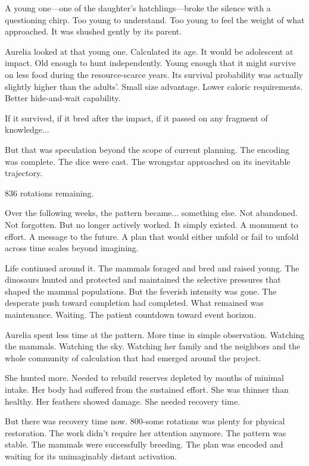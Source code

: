 A young one—one of the daughter's hatchlings—broke the silence with a questioning chirp. Too young to understand. Too young to feel the weight of what approached. It was shushed gently by its parent.

Aurelia looked at that young one. Calculated its age. It would be adolescent at impact. Old enough to hunt independently. Young enough that it might survive on less food during the resource-scarce years. Its survival probability was actually slightly higher than the adults'. Small size advantage. Lower caloric requirements. Better hide-and-wait capability.

If it survived, if it bred after the impact, if it passed on any fragment of knowledge...

But that was speculation beyond the scope of current planning. The encoding was complete. The dice were cast. The wrongstar approached on its inevitable trajectory.

836 rotations remaining.

\scenebreak

Over the following weeks, the pattern became... something else. Not abandoned. Not forgotten. But no longer actively worked. It simply existed. A monument to effort. A message to the future. A plan that would either unfold or fail to unfold across time scales beyond imagining.

Life continued around it. The mammals foraged and bred and raised young. The dinosaurs hunted and protected and maintained the selective pressures that shaped the mammal populations. But the feverish intensity was gone. The desperate push toward completion had completed. What remained was maintenance. Waiting. The patient countdown toward event horizon.

Aurelia spent less time at the pattern. More time in simple observation. Watching the mammals. Watching the sky. Watching her family and the neighbors and the whole community of calculation that had emerged around the project.

She hunted more. Needed to rebuild reserves depleted by months of minimal intake. Her body had suffered from the sustained effort. She was thinner than healthy. Her feathers showed damage. She needed recovery time.

But there was recovery time now. 800-some rotations was plenty for physical restoration. The work didn't require her attention anymore. The pattern was stable. The mammals were successfully breeding. The plan was encoded and waiting for its unimaginably distant activation.

